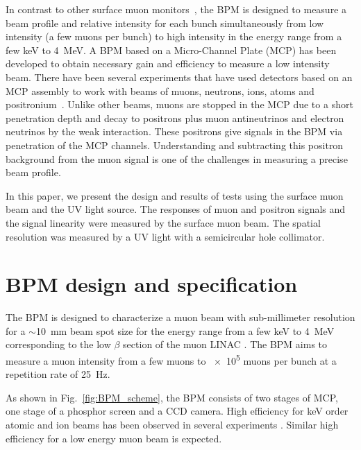 \documentclass[preprint,3p,twocolumn]{elsarticle}
\begin{document}
In contrast to other surface muon monitors~\cite{muon_bpm1,
muon_bpm3}, the BPM is designed to measure a beam profile and
relative intensity for each bunch simultaneously from low
intensity (a few muons per bunch) to high intensity in the energy
range from a few \si{keV} to \SI{4}{\MeV}.  A BPM based on
a Micro-Channel Plate (MCP) has been developed to obtain necessary
gain and efficiency to measure a low intensity beam.  There have
been several experiments that have used detectors based on an MCP
assembly to work with beams of muons, neutrons, ions, atoms and
positronium~\cite{muon_bpm2, neutron, Ps}.  Unlike
other beams, muons are stopped in the MCP due to a short penetration depth
and decay to positrons plus muon antineutrinos and electron
neutrinos by the weak interaction. These positrons give signals in
the BPM via penetration of the MCP channels.  Understanding and
subtracting this positron background from the muon signal is one
of the challenges in measuring a precise beam profile.

In this paper, we present the design and results of tests using
the surface muon beam and the UV light source.  The responses of
muon and positron signals and the signal linearity were measured
by the surface
muon beam.  The spatial resolution was measured by a UV light
with a semicircular hole collimator.


\section{BPM design and specification}

The BPM is designed to characterize a muon beam with sub-millimeter
resolution for a $\sim$\SI{10}{\mm} beam spot size for the energy
range from a few \si{\keV} to \SI{4}{\MeV} corresponding to the low $\beta$ section
of the muon LINAC \cite{IH}.  The BPM aims to measure a muon
intensity from a few muons to \num{e5} muons per bunch at a
repetition rate of \SI{25}{\hertz}.

As shown in Fig.~\ref{fig:BPM_scheme}, the BPM consists of two
stages of MCP, one stage of a phosphor screen and a CCD camera.
High efficiency for \si{\keV} order atomic and ion beams has been
observed in several experiments \cite{MCP_efficiency,
MCP_efficiency1}. Similar high efficiency for a low energy muon
beam is expected.
\end{document}
